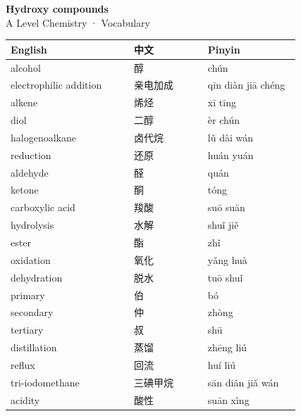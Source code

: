 \documentclass[11pt]{article}
\begin{document}
\begin{center}
  {\LARGE\bfseries Hydroxy compounds}\\[0.35em]
  {\large A Level Chemistry · Vocabulary}
\end{center}
\vspace{0.6em}

\begin{longtable}{@{}p{0.40\linewidth}p{0.24\linewidth}p{0.30\linewidth}@{}}
\toprule
\textbf{English} & \textbf{中文} & \textbf{Pinyin} \\
\midrule
\endhead
\bottomrule
\endlastfoot
alcohol & 醇 & chún \\
electrophilic addition & 亲电加成 & qīn diàn jiā chéng \\
alkene & 烯烃 & xī tīng \\
diol & 二醇 & èr chún \\
halogenoalkane & 卤代烷 & lǔ dài wán \\
reduction & 还原 & huán yuán \\
aldehyde & 醛 & quán \\
ketone & 酮 & tóng \\
carboxylic acid & 羧酸 & suō suān \\
hydrolysis & 水解 & shuǐ jiě \\
ester & 酯 & zhǐ \\
oxidation & 氧化 & yǎng huà \\
dehydration & 脱水 & tuō shuǐ \\
primary & 伯 & bó \\
secondary & 仲 & zhòng \\
tertiary & 叔 & shū \\
distillation & 蒸馏 & zhēng liú \\
reflux & 回流 & huí liú \\
tri-iodomethane & 三碘甲烷 & sān diǎn jiǎ wán \\
acidity & 酸性 & suān xìng \\
\end{longtable}
\end{document}
